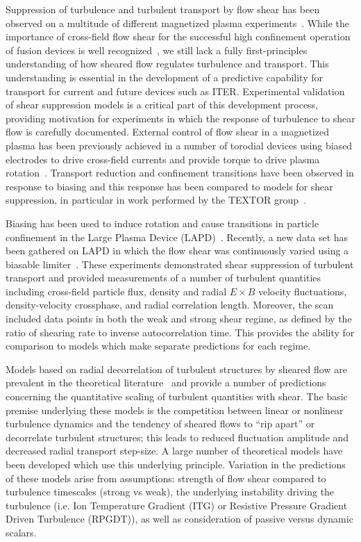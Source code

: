 \documentclass[aip,pop,amsmath,amssymb,preprint,superscriptaddress]{revtex4-1} %
\begin{document}
Suppression of turbulence and turbulent transport by flow shear has
been observed on a multitude of different magnetized plasma
experiments~\cite{burrell97,burrell99,terry00,oost03,sakai93,maggs07,carter09,schaffner12}. While
the importance of cross-field flow shear for the successful high
confinement operation of fusion devices is well
recognized~\cite{burrell92,wagner07}, we still lack a fully first-principles
understanding of how sheared flow regulates turbulence and transport.
This understanding is essential in the development
of a predictive capability for transport for current and future
devices such as ITER. Experimental validation of shear suppression
models is a critical part of this development process, providing
motivation for experiments in which the response of turbulence to
shear flow is carefully documented.  External control of flow shear in
a magnetized plasma has been previously achieved in a number of
torodial devices using biased electrodes to drive cross-field currents
and provide torque to drive plasma
rotation~\cite{taylor89,weynants92}.   Transport reduction and
confinement transitions have been observed in response to biasing and
this response has been compared to models for shear suppression, in
particular in work performed by the TEXTOR group~\cite{weynants98,boedo00,boedo02}.

Biasing has been used to induce rotation and cause transitions in particle
confinement in the Large Plasma Device
(LAPD)~\cite{maggs07,carter09}. Recently, a new data set has been
gathered on LAPD in which the flow shear was continuously varied using
a biasable limiter~\cite{schaffner12}. These experiments demonstrated
shear suppression of turbulent transport and provided measurements of a number of turbulent quantities including cross-field particle flux, density and radial $E\times B$ velocity fluctuations, density-velocity crossphase, and radial correlation length. Moreover, the scan included data points in both the weak and strong shear regime, as defined by the ratio of shearing rate to inverse autocorrelation time.  This provides the ability for comparison to models which make separate predictions for each regime.

Models based on radial decorrelation of turbulent structures by
sheared flow are prevalent in the theoretical literature~\cite{biglari90,shaing90,zhang92,zhang93,ware96,ware98,terry01,kim03,kim04,newton11} and provide a
number of predictions concerning the quantitative scaling of turbulent
quantities with shear. The basic premise underlying these models is the competition between linear or nonlinear turbulence
dynamics and the tendency of sheared flows to ``rip apart'' or
decorrelate turbulent structures; this leads to reduced
fluctuation amplitude and decreased radial transport step-size. A
large number of theoretical models have been developed which use this
underlying principle. Variation in the predictions of these models
arise from assumptions: strength of flow shear compared to turbulence
timescales (strong vs weak), the underlying instability driving the
turbulence (i.e. Ion Temperature Gradient (ITG) or Resistive Pressure
Gradient Driven Turbulence (RPGDT)), as well as consideration of passive versus dynamic scalars. 
\end{document}

